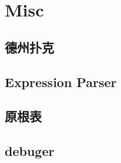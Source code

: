 \section{Misc}

\subsection{德州扑克}


\subsection{Expression Parser}


\subsection{原根表}


\subsection{debuger}

